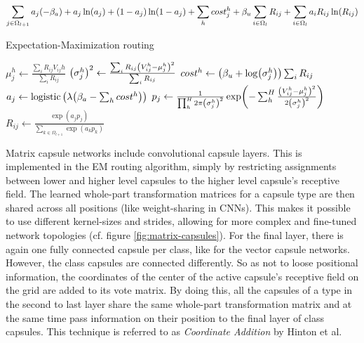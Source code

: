 \begin{align}
    \sum_{j\in\Omega_{l+1}}a_j\qty(-\beta_a)+a_j \ln(a_j)+(1-a_j)\ln(1-a_j)+\sum_h cost_j^h+\beta_u\sum_{i\in\Omega_l}R_{ij}+\sum_{i\in\Omega_l}a_i R_{ij} \ln(R_{ij})\label{eq:objective-function}
\end{align}
\begin{algorithm}
\caption{Expectation-Maximization routing}\label{alg:em-routing}
\begin{algorithmic}[1]
        \EndFor
    \EndFor
            \State{}
        \EndFor
            \State{}
        \EndFor
    \EndFor
    \State{}
\EndProcedure
{}
    \EndFor
        \State $\mu_{j}^h \gets \frac{\sum_i R_{ij} V_{ij}h}{\sum_i R_{ij}}$
        \State $\qty(\sigma_j^h)^2 \gets \frac{\sum_i R_{ij} \qty(V_{ij}^h-\mu_j^h)^2}{\sum_i R_{ij}}$
        \State $cost^h \gets \qty(\beta_u + \log(\sigma_j^h))\sum_i R_{ij}$
    \EndFor
    \State $a_j \gets \operatorname{logistic}\qty(\lambda\qty(\beta_a - \sum_h cost^h))$
    \State{}
\EndProcedure
{}
        \State $p_j \gets \frac{1}{\prod_h^H 2\pi \qty(\sigma_j^h)^2}\exp(-\sum_h^H\frac{\qty(V_{ij}^h-\mu_j^h)^2}{2\qty(\sigma_j^h)^2})$
        \State $R_{ij} \gets \frac{\exp(a_j p_j)}{\sum_{k\in\Omega_{l+1}} \exp(a_k p_k)}$
        \State{}
    \EndFor
\EndProcedure
\end{algorithmic}
\end{algorithm}
Matrix capsule networks include convolutional capsule layers. This is implemented in the EM routing algorithm, simply by restricting assignments between lower and higher level capsules to the higher level capsule's receptive field. The learned whole-part transformation matrices for a capsule type are then shared across all positions (like weight-sharing in CNNs). This makes it possible to use different kernel-sizes and strides, allowing for more complex and fine-tuned network topologies (cf. figure \ref{fig:matrix-capsules}). For the final layer, there is again one fully connected capsule per class, like for the vector capsule networks. However, the class capsules are connected differently. So as not to loose positional information, the coordinates of the center of the active capsule's receptive field on the grid are added to its vote matrix. By doing this, all the capsules of a type in the second to last layer share the same whole-part transformation matrix and at the same time pass information on their position to the final layer of class capsules. This technique is referred to as \emph{Coordinate Addition} by Hinton et al.

